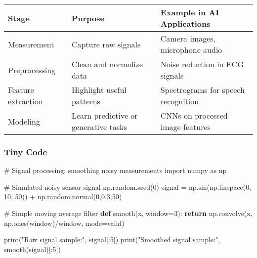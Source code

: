 \documentclass[
  letterpaper,
  DIV=11,
  numbers=noendperiod]{scrreprt}
\newenvironment{Shaded}{\begin{snugshade}}{\end{snugshade}}
\newcommand{\BuiltInTok}[1]{\textcolor[rgb]{0.00,0.23,0.31}{#1}}
\newcommand{\CommentTok}[1]{\textcolor[rgb]{0.37,0.37,0.37}{#1}}
\newcommand{\ControlFlowTok}[1]{\textcolor[rgb]{0.00,0.23,0.31}{\textbf{#1}}}
\newcommand{\DecValTok}[1]{\textcolor[rgb]{0.68,0.00,0.00}{#1}}
\newcommand{\FloatTok}[1]{\textcolor[rgb]{0.68,0.00,0.00}{#1}}
\newcommand{\ImportTok}[1]{\textcolor[rgb]{0.00,0.46,0.62}{#1}}
\newcommand{\KeywordTok}[1]{\textcolor[rgb]{0.00,0.23,0.31}{\textbf{#1}}}
\newcommand{\NormalTok}[1]{\textcolor[rgb]{0.00,0.23,0.31}{#1}}
\newcommand{\OperatorTok}[1]{\textcolor[rgb]{0.37,0.37,0.37}{#1}}
\newcommand{\StringTok}[1]{\textcolor[rgb]{0.13,0.47,0.30}{#1}}
\begin{document}
\begin{longtable}[]{@{}
  >{\raggedright\arraybackslash}p{}
  >{\raggedright\arraybackslash}p{}
  >{\raggedright\arraybackslash}p{}@{}}
\toprule\noalign{}
\begin{minipage}[b]{\linewidth}\raggedright
Stage
\end{minipage} & \begin{minipage}[b]{\linewidth}\raggedright
Purpose
\end{minipage} & \begin{minipage}[b]{\linewidth}\raggedright
Example in AI Applications
\end{minipage} \\
\midrule\noalign{}
\endhead
\bottomrule\noalign{}
\endlastfoot
Measurement & Capture raw signals & Camera images, microphone audio \\
Preprocessing & Clean and normalize data & Noise reduction in ECG
signals \\
Feature extraction & Highlight useful patterns & Spectrograms for speech
recognition \\
Modeling & Learn predictive or generative tasks & CNNs on processed
image features \\
\end{longtable}

\subsubsection{Tiny Code}\label{tiny-code-72}

\begin{Shaded}
\begin{Highlighting}[]
\CommentTok{\# Signal processing: smoothing noisy measurements}
\ImportTok{import}\NormalTok{ numpy }\ImportTok{as}\NormalTok{ np}

\CommentTok{\# Simulated noisy sensor signal}
\NormalTok{np.random.seed(}\DecValTok{0}\NormalTok{)}
\NormalTok{signal }\OperatorTok{=}\NormalTok{ np.sin(np.linspace(}\DecValTok{0}\NormalTok{, }\DecValTok{10}\NormalTok{, }\DecValTok{50}\NormalTok{)) }\OperatorTok{+}\NormalTok{ np.random.normal(}\DecValTok{0}\NormalTok{,}\FloatTok{0.3}\NormalTok{,}\DecValTok{50}\NormalTok{)}

\CommentTok{\# Simple moving average filter}
\KeywordTok{def}\NormalTok{ smooth(x, window}\OperatorTok{=}\DecValTok{3}\NormalTok{):}
    \ControlFlowTok{return}\NormalTok{ np.convolve(x, np.ones(window)}\OperatorTok{/}\NormalTok{window, mode}\OperatorTok{=}\StringTok{\textquotesingle{}valid\textquotesingle{}}\NormalTok{)}

\BuiltInTok{print}\NormalTok{(}\StringTok{"Raw signal sample:"}\NormalTok{, signal[:}\DecValTok{5}\NormalTok{])}
\BuiltInTok{print}\NormalTok{(}\StringTok{"Smoothed signal sample:"}\NormalTok{, smooth(signal)[:}\DecValTok{5}\NormalTok{])}
\end{Highlighting}
\end{Shaded}
\end{document}
